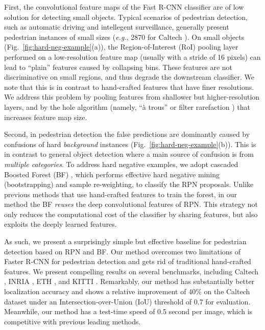 \documentclass[runningheads]{llncs}
\def\eg{\emph{e.g.}}
\begin{document}
First, the convolutional feature maps of the Fast R-CNN classifier are of low solution for detecting small objects. Typical scenarios of pedestrian detection, such as automatic driving and intellegent surveillance, generally present pedestrian instances of small sizes (\eg, 2870 for Caltech \cite{dollar2012pedestrian}). On small objects (Fig.~\ref{fig:hard-neg-example}(a)), the Region-of-Interest (RoI) pooling layer \cite{he14ECCV,girshickICCV15fastrcnn} performed on a low-resolution feature map (usually with a stride of 16 pixels) can lead to ``plain'' features caused by collapsing bins. These features are not discriminative on small regions, and thus degrade the downstream classifier. We note that this is in contrast to hand-crafted features that have finer resolutions.
We address this problem by pooling features from shallower but higher-resolution layers, and by the hole algorithm (namely, ``{\`a} trous'' \cite{chen2014semantic} or filter rarefaction \cite{long2015fully}) that increases feature map size.

Second, in pedestrian detection the false predictions are dominantly caused by confusions of hard \emph{background} instances (Fig.~\ref{fig:hard-neg-example}(b)). This is in contrast to general object detection where a main source of confusion is from \emph{multiple categories}. To address hard negative examples, we adopt cascaded Boosted Forest (BF) \cite{friedman2000additive,appel2013quickly}, which performs effective hard negative mining (bootstrapping) and sample re-weighting, to classify the RPN proposals. Unlike previous methods that use hand-crafted features to train the forest, in our method the BF \emph{reuses} the deep convolutional features of RPN. This strategy not only reduces the computational cost of the classifier by sharing features, but also exploits the deeply learned features.

As such, we present a surprisingly simple but effective baseline for pedestrian detection based on RPN and BF. Our method overcomes two limitations of Faster R-CNN for pedestrian detection and gets rid of traditional hand-crafted features. We present compelling results on several benchmarks, including Caltech \cite{dollar2012pedestrian}, INRIA \cite{dalal2005histograms}, ETH \cite{ess2007depth}, and KITTI \cite{geiger2012kitti}. Remarkably, our method has substantially better localization accuracy and shows a relative improvement of 40\% on the Caltech dataset under an Intersection-over-Union (IoU) threshold of 0.7 for evaluation.
Meanwhile, our method has a test-time speed of 0.5 second per image, which is competitive with previous leading methods.
\end{document}
